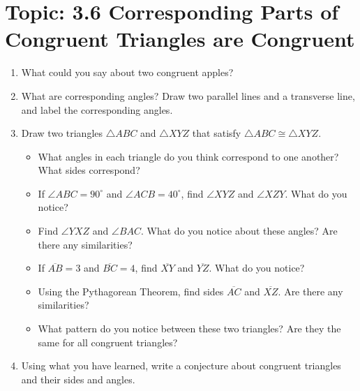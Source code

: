 \documentclass[12pt,letterpaper]{article}
\begin{document}

\newpage
\section*{Topic: 3.6 Corresponding Parts of Congruent Triangles are Congruent}
\begin{enumerate}[label=\arabic*.]
    \item What could you say about two congruent apples?
    \item What are corresponding angles? Draw two parallel lines and a transverse line, and label the corresponding angles.
    \item Draw two triangles $\triangle ABC$ and $\triangle XYZ$ that satisfy $\triangle ABC \cong \triangle XYZ$.
          \begin{itemize}
              \item What angles in each triangle do you think correspond to one another? What sides correspond?
              \item If $\angle ABC = 90^{\circ}$ and $\angle ACB = 40^{\circ}$, find $\angle XYZ$ and $\angle XZY$. What do you notice?
              \item Find $\angle YXZ$ and $\angle BAC$. What do you notice about these angles? Are there any similarities?
              \item If $\overline{AB} = 3$ and $\overline{BC} = 4$, find $\overline{XY}$ and $\overline{YZ}$. What do you notice?
              \item Using the Pythagorean Theorem, find sides $\overline{AC}$ and $\overline{XZ}$. Are there any similarities?
              \item What pattern do you notice between these two triangles? Are they the same for all congruent triangles?
          \end{itemize}
    \item Using what you have learned, write a conjecture about congruent triangles and their sides and angles.
\end{enumerate}
\end{document}
